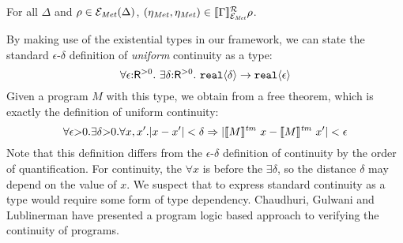 \begin{lemma}
  For all $\Delta$ and $\rho \in \mathcal{E}_{\mathit{Met}}(\Delta)$,
  $(\eta_{\mathit{Met}}, \eta_{\mathit{Met}}) \in
  \llbracket \Gamma \rrbracket^{\mathcal{R}}_{\mathcal{E}_{\mathit{Met}}}{\rho}$.
\end{lemma}

\begin{example}
  By making use of the existential types in our framework, we can
  state the standard $\epsilon$-$\delta$ definition of
  \emph{uniform} continuity as a type:
  \begin{displaymath}
    \forall \epsilon \mathord: \mathsf{R}^{>0}.\ \exists \delta\mathord: \mathsf{R}^{>0}.\ \textup{\texttt{real}}\langle \delta \rangle \to \textup{\texttt{real}}\langle \epsilon \rangle
  \end{displaymath}
  Given a program $M$ with this type, we obtain from
   a free theorem, which is exactly the
  definition of uniform continuity:
  \begin{displaymath}
    \forall \epsilon \mathord> 0. \exists \delta \mathord> 0. \forall x,x'. |x - x'| < \delta \Rightarrow |\llbracket M \rrbracket^{\mathit{tm}}\ x - \llbracket M \rrbracket^{\mathit{tm}}\ x'| < \epsilon
  \end{displaymath}
  Note that this definition differs from the $\epsilon$-$\delta$
  definition of continuity by the order of quantification. For
  continuity, the $\forall x$ is before the $\exists \delta$, so the
  distance $\delta$ may depend on the value of $x$. We suspect that to
  express standard continuity as a type would require some form of
  type dependency. Chaudhuri, Gulwani and Lublinerman
  \cite{chaudhuri10continuity} have presented a program logic based
  approach to verifying the continuity of programs.
\end{example}






